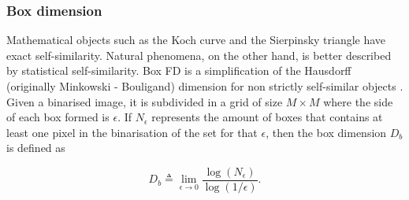 %
%

\subsubsection{Box dimension}
\label{sec:3}
Mathematical objects such as the Koch curve and the Sierpinsky triangle have exact self-similarity. Natural phenomena, on the other hand, is better described by statistical self-similarity. Box FD is a simplification of the Hausdorff (originally Minkowski - Bouligand) dimension for non strictly self-similar objects \cite{Peitgen2004}. Given a binarised image, it is subdivided in a grid of size $M\times M$ where the side of each box formed is $\epsilon$. If $N_{\epsilon}$ represents the amount of boxes that contains at least one pixel in the binarisation of the set for that $\epsilon$, then the box dimension  $D_{b}$ is defined as

\begin{equation}
D_{b} \triangleq \displaystyle\lim_{\epsilon \to 0}{\frac{\log(N_{\epsilon})}{\log (1/\epsilon)}}.
\label{eqn:1}
\end{equation}


